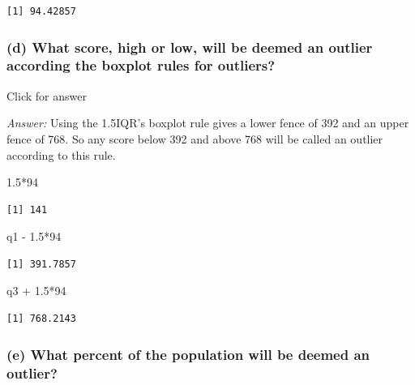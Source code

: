 \documentclass[
]{book}
\newenvironment{Shaded}{\begin{snugshade}}{\end{snugshade}}
\newcommand{\DecValTok}[1]{\textcolor[rgb]{0.00,0.00,0.81}{#1}}
\newcommand{\FloatTok}[1]{\textcolor[rgb]{0.00,0.00,0.81}{#1}}
\newcommand{\NormalTok}[1]{#1}
\newcommand{\SpecialCharTok}[1]{\textcolor[rgb]{0.00,0.00,0.00}{#1}}
\begin{document}
\begin{verbatim}
[1] 94.42857
\end{verbatim}

\hypertarget{d-what-score-high-or-low-will-be-deemed-an-outlier-according-the-boxplot-rules-for-outliers}{%
\subsubsection{(d) What score, high or low, will be deemed an outlier according the boxplot rules for outliers?}\label{d-what-score-high-or-low-will-be-deemed-an-outlier-according-the-boxplot-rules-for-outliers}}

Click for answer

\emph{Answer:} Using the 1.5IQR's boxplot rule gives a lower fence of 392 and an upper fence of 768. So any score below 392 and above 768 will be called an outlier according to this rule.

\begin{Shaded}
\begin{Highlighting}[]
\FloatTok{1.5}\SpecialCharTok{*}\DecValTok{94}
\end{Highlighting}
\end{Shaded}

\begin{verbatim}
[1] 141
\end{verbatim}

\begin{Shaded}
\begin{Highlighting}[]
\NormalTok{q1 }\SpecialCharTok{{-}} \FloatTok{1.5}\SpecialCharTok{*}\DecValTok{94}
\end{Highlighting}
\end{Shaded}

\begin{verbatim}
[1] 391.7857
\end{verbatim}

\begin{Shaded}
\begin{Highlighting}[]
\NormalTok{q3 }\SpecialCharTok{+} \FloatTok{1.5}\SpecialCharTok{*}\DecValTok{94}
\end{Highlighting}
\end{Shaded}

\begin{verbatim}
[1] 768.2143
\end{verbatim}

\hypertarget{e-what-percent-of-the-population-will-be-deemed-an-outlier}{%
\subsubsection{(e) What percent of the population will be deemed an outlier?}\label{e-what-percent-of-the-population-will-be-deemed-an-outlier}}
\end{document}
